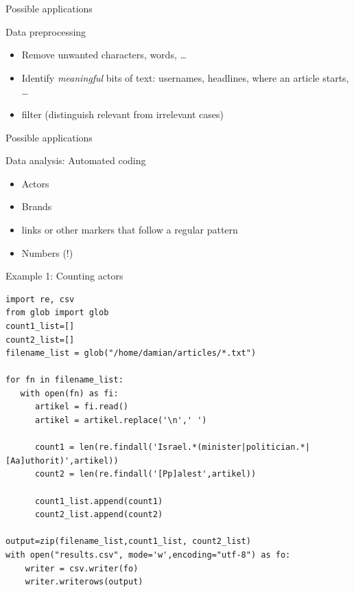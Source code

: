 \documentclass[handout]{beamer}
\begin{document}
\begin{frame}{Possible applications}
\begin{block}{Data preprocessing}
\begin{itemize}
\item Remove unwanted characters, words, \ldots
\item Identify \emph{meaningful} bits of text: usernames, headlines, where an article starts, \ldots
\item filter (distinguish relevant from irrelevant cases)
\end{itemize}
\end{block}
\end{frame}


\begin{frame}{Possible applications}
\begin{block}{Data analysis: Automated coding}
\begin{itemize}
\item Actors
\item Brands
\item links or other markers that follow a regular pattern
\item Numbers (!)
\end{itemize}
\end{block}
\end{frame}

\begin{frame}{Example 1: Counting actors}
\begin{lstlisting}
import re, csv
from glob import glob
count1_list=[]
count2_list=[]
filename_list = glob("/home/damian/articles/*.txt")

for fn in filename_list:
   with open(fn) as fi:
      artikel = fi.read()
      artikel = artikel.replace('\n',' ')
      
      count1 = len(re.findall('Israel.*(minister|politician.*|[Aa]uthorit)',artikel))
      count2 = len(re.findall('[Pp]alest',artikel))

      count1_list.append(count1)
      count2_list.append(count2)
      
output=zip(filename_list,count1_list, count2_list)
with open("results.csv", mode='w',encoding="utf-8") as fo:
    writer = csv.writer(fo)
    writer.writerows(output)
\end{lstlisting}
\end{frame}
\end{document}

